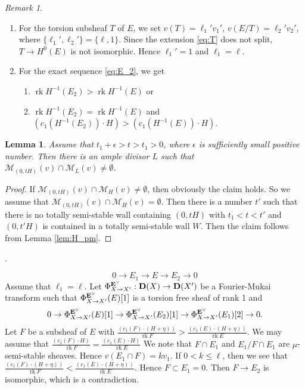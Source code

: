 \documentclass[10pt]{amsart}
\def\cal{\mathcal}
\newenvironment{NB}{
\color{red}{\bf NB}. \footnotesize 
}{}
\newcommand{\rk}{\operatorname{rk}}
\numberwithin{equation}{section}
\theoremstyle{plain}
\newtheorem{lem}[thm]{Lemma}
\theoremstyle{definition}
\theoremstyle{remark}
\newtheorem{rem}[thm]{Remark}
\begin{document}
\begin{rem}
\begin{enumerate}
\item[(1)]
For the torsion subsheaf $T$ of $E$, 
we set $v(T)=\ell_1' v_1'$, $v(E/T)=\ell_2' v_2'$, 
where 
$\{\ell_1',\ell_2' \}=\{\ell,1\}$.
Since the extension \eqref{eq:T} does not split,
$T \to H^0(E)$ is not isomorphic.
Hence $\ell_1'=1$ and $\ell_1=\ell$.
\item[(2)]
For the exact sequence \eqref{eq:E_2}, we get
\begin{enumerate}
\item
$\rk H^{-1}(E_2) > \rk H^{-1}(E)$ or
\item
$\rk H^{-1}(E_2) = \rk H^{-1}(E)$ and 
$(c_1(H^{-1}(E_2)) \cdot H) > (c_1(H^{-1}(E)) \cdot H)$.
\end{enumerate}
\end{enumerate}
\end{rem}

\begin{lem}\label{lem:Gieseker}
Assume that $t_1+\epsilon>t>t_1>0$, where $\epsilon$ is sufficiently small positive number.
Then there is an ample divisor $L$ such that
${\cal M}_{(0,tH)}(v) \cap {\cal M}_{L}(v) \ne \emptyset$.
\end{lem}

\begin{proof}
If ${\cal M}_{(0,tH)}(v) \cap {\cal M}_{H}(v) \ne \emptyset$, then
obviously the claim holds.
So we assume that ${\cal M}_{(0,tH)}(v) \cap {\cal M}_{H}(v)= \emptyset$.
Then there is a number $t'$ such that there is no totally semi-stable wall containing $(0,tH)$
with $t_1<t<t'$ and $(0,t'H)$ is contained in a totally semi-stable wall $W$.
Then the claim follows from Lemma \ref{lem:H_pm}. 
\end{proof}



\begin{NB}
$$
0 \to E_1 \to E \to E_2 \to 0
$$
Assume that $\ell_1=\ell$.
Let $\Phi_{X \to X'}^{{\bf E}^{\vee}}:{\bf D}(X) \to {\bf D}(X')$ be 
a Fourier-Mukai transform such that
$\Phi_{X \to X'}^{{\bf E}^{\vee}}(E)[1]$ is a torsion free sheaf of rank 1
and 
$$
0 \to \Phi_{X \to X'}^{{\bf E}^{\vee}}(E)[1] \to \Phi_{X \to X'}^{{\bf E}^{\vee}}(E_2)[1]
\to \Phi_{X \to X'}^{{\bf E}^{\vee}}(E_1)[2] \to 0.
$$
Let $F$ be a subsheaf of $E$ with 
$\frac{(c_1(F) \cdot (H+\eta))}{\rk F}> \frac{(c_1(E) \cdot (H+\eta))}{\rk E}$.
We may assume that 
$\frac{(c_1(F) \cdot H)}{\rk F}= \frac{(c_1(E) \cdot H)}{\rk E}$
We note that $F \cap E_1$ and $E_1/F \cap E_1$ are $\mu$-semi-stable sheaves.
Hence $v(E_1 \cap F)=kv_1$. If $0<k \leq \ell$, then 
we see that
$\frac{(c_1(F) \cdot (H+\eta))}{\rk F}< \frac{(c_1(E) \cdot (H+\eta))}{\rk E}$.
Hence $F \subset E_1=0$. Then $F \to E_2$ is isomorphic, which is a contradiction.
\end{NB}
\end{document}
